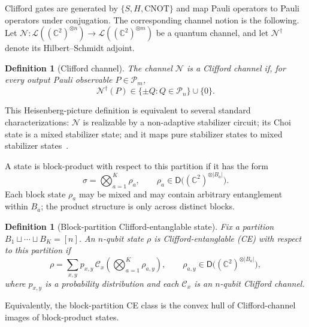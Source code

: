 \documentclass[
  aps,
  prx,
  reprint,
  superscriptaddress,
  amsmath,
  amssymb,
  nofootinbib,
  longbibliography
]{revtex4-2}
\newtheorem{definition}[theorem]{Definition}
\newcommand{\D}{\mathsf{D}}
\newcommand{\Pc}{\mathcal{P}}
\newcommand{\map}[1]{\mathcal{#1}}
\begin{document}
Clifford gates are generated by $\{S,H,\mathrm{CNOT}\}$ and map Pauli
operators to Pauli operators under conjugation.  The corresponding channel
notion is the following.  Let
$\map N:\mathcal L((\mathbb C^2)^{\otimes n})
\to \mathcal L((\mathbb C^2)^{\otimes m})$ be a quantum channel, and let
$\map N^\dagger$ denote its Hilbert--Schmidt adjoint.

\begin{definition}[Clifford channel]
\label{def:supp-clifford-channel}
The channel $\map N$ is a \emph{Clifford channel} if, for every output
Pauli observable $P\in\Pc_m$,
\begin{equation}
\map N^\dagger(P)\in \{\pm Q:Q\in\Pc_n\}\cup\{0\}.
\end{equation}
\end{definition}

This Heisenberg-picture definition is equivalent to several standard
characterizations: $\map N$ is realizable by a non-adaptive stabilizer
circuit; its Choi state is a mixed stabilizer state; and it maps pure
stabilizer states to mixed stabilizer states~\cite{yashin2025characterization}.

A state is block-product with respect to this partition if it has the form
\begin{equation}
\sigma=\bigotimes_{a=1}^K \rho_a,
\qquad
\rho_a\in \D\!\bigl((\mathbb C^2)^{\otimes |B_a|}\bigr).
\label{eq:supp-block-product-state}
\end{equation}
Each block state $\rho_a$ may be mixed and may contain arbitrary
entanglement within $B_a$; the product structure is only across distinct
blocks.

\begin{definition}[Block-partition Clifford-entanglable state]
\label{def:supp-block-partition-ce}
Fix a partition $B_1\sqcup\cdots\sqcup B_K=[n]$.  An $n$-qubit state $\rho$
is Clifford-entanglable (CE) with respect to this partition if
\begin{equation}
\rho
=
\sum_{x,y}p_{x,y}\,
\map C_x
\left(
\bigotimes_{a=1}^{K}\rho_{a,y}
\right),
\qquad
\rho_{a,y}\in \D\!\bigl((\mathbb C^2)^{\otimes |B_a|}\bigr),
\label{eq:supp-block-partition-ce}
\end{equation}
where $p_{x,y}$ is a probability distribution and each $\map C_x$ is an
$n$-qubit Clifford channel.
\end{definition}

Equivalently, the block-partition CE class is the convex hull of
Clifford-channel images of block-product states.
\end{document}
